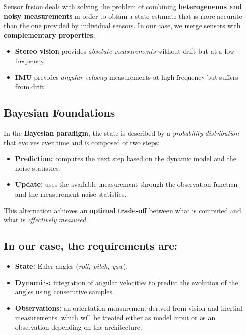 Sensor fusion deals with solving the problem of combining \textbf{heterogeneous and noisy measurements} in order to obtain a state estimate that is more accurate than the one provided by individual sensors.  
In our case, we merge sensors with \textbf{complementary properties}:  
\begin{itemize}
    \item \textbf{Stereo vision} provides \textit{absolute measurements} without drift but at a low frequency.  
    \item \textbf{IMU} provides \textit{angular velocity} measurements at high frequency but suffers from drift.  
\end{itemize}

\subsection*{Bayesian Foundations}
In the \textbf{Bayesian paradigm}, the state is described by a \textit{probability distribution} that evolves over time and is composed of two steps:  
\begin{itemize}
    \item \textbf{Prediction:} computes the next step based on the dynamic model and the noise statistics.  
    \item \textbf{Update:} uses the available measurement through the observation function and the measurement noise statistics.  
\end{itemize}

This alternation achieves an \textbf{optimal trade-off} between what is computed and what is \textit{effectively measured}.  

\subsection*{In our case, the requirements are:}
\begin{itemize}
    \item \textbf{State:} Euler angles (\textit{roll, pitch, yaw}).  
    \item \textbf{Dynamics:} integration of angular velocities to predict the evolution of the angles using consecutive samples.  
    \item \textbf{Observations:} an orientation measurement derived from vision and inertial measurements, which will be treated either as model input or as an observation depending on the architecture.  
\end{itemize}

